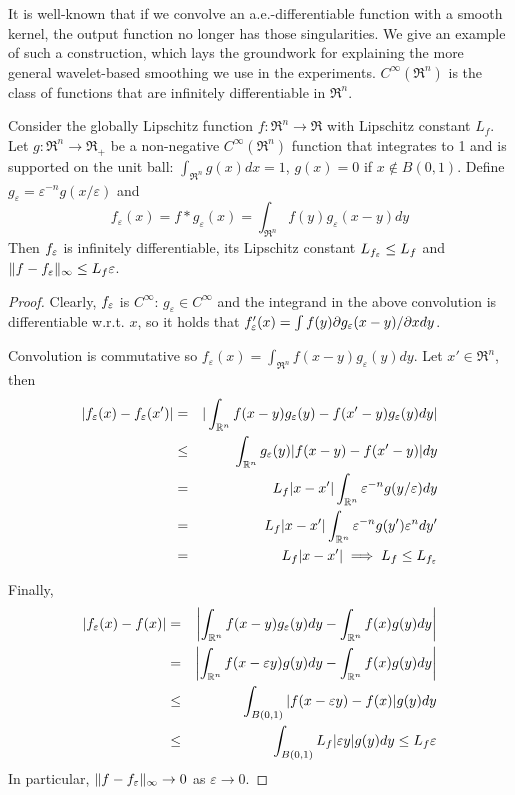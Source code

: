It is well-known that if we convolve an a.e.-differentiable function with a smooth kernel, the output function no longer has those singularities.
We give an example of such a construction, which lays the groundwork for explaining the more general wavelet-based smoothing we use in the experiments.
$C^\infty(\Re^n)$ is the class of functions that are infinitely differentiable in $\Re^n$.
\begin{theorem}
	\label{thm:ge smoothing}
	Consider the globally Lipschitz function $f:\Re^n \rightarrow \Re$ with Lipschitz constant $L_f$.
	Let $g: \Re^n \rightarrow \Re_+$ be a non-negative $C^\infty(\Re^n)$ function that integrates to 1 and is supported on the unit ball:
	$\int_{\Re^n}g(x)dx = 1$, $g(x) = 0$ if $x \notin B(0,1)$.
	Define $g_\varepsilon = \varepsilon^{-n}g(x/\varepsilon)$ and
	\[f_\varepsilon(x) = f *g_\varepsilon(x) = \int_{\Re^n}f(y)g_\varepsilon(x-y)dy\]
	Then $f_\varepsilon$ is infinitely differentiable, its Lipschitz constant $L_{f_\varepsilon} \leq L_f$ and $\|f-f_\varepsilon\|_\infty \leq L_f \varepsilon$.
\end{theorem}
\begin{proof}
	Clearly, $f_\varepsilon$ is $C^\infty$: $g_\varepsilon \in C^\infty$ and the integrand in the above convolution is differentiable w.r.t. $x$, so it holds that $f_\varepsilon'(x) = \int{f(y)\partial g_\varepsilon(x-y)/\partial x dy}$.
	
	Convolution is commutative so $f_\varepsilon(x) = \int_{\Re^n}f(x-y)g_\varepsilon(y)dy$.
	Let $x' \in \Re^n$, then 
	\begin{eqnarray*}
	|f_\varepsilon(x)-f_\varepsilon(x')| &=& |\int_{\mathbb{R}^n} f(x-y)g_\varepsilon(y) - f(x'-y)g_\varepsilon(y) dy|
	\\
	&\leq & \int_{\mathbb{R}^n} g_\varepsilon(y)|f(x-y) - f(x'-y)| dy
	\\
	& = & L_f|x-x'| \int_{\mathbb{R}^n} \varepsilon^{-n} g(y/\varepsilon) dy
	\\
	&= &L_f|x-x'| \int_{\mathbb{R}^n} \varepsilon^{-n} g(y') \varepsilon^ndy'
	\\
	&=& L_f|x-x'| \implies L_f \leq L_{f_\varepsilon}
	\end{eqnarray*}
	
	Finally, 
	\begin{eqnarray*}
	|f_\varepsilon(x)-f(x)| &=& \left|\int_{\mathbb{R}^n}f(x-y)g_\varepsilon(y)dy - \int_{\mathbb{R}^n}f(x)g(y)dy\right|
	\\
	&=& \left|\int_{\mathbb{R}^n}f(x-\varepsilon y)g(y)dy - \int_{\mathbb{R}^n}f(x)g(y)dy\right|
	\\
	&\leq& \int_{B(0,1)}|f(x- \varepsilon y) - f(x)|g(y)dy	
	\\
	&\leq & \int_{B(0,1)}L_f | \varepsilon y| g(y)dy \leq L_f \varepsilon
	\end{eqnarray*}
	In particular, $\|f-f_\varepsilon\|_\infty \rightarrow 0$ as $\varepsilon \rightarrow 0$.
\end{proof}
